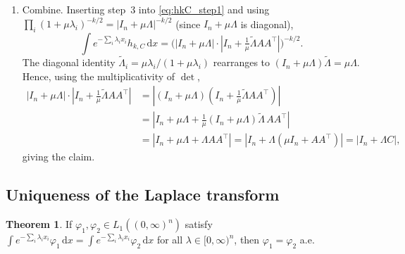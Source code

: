 \documentclass[12pt,a4paper]{article}
\makeatletter
\theoremstyle{definition}
\newtheorem{theorem}{Theorem}[section]
\renewenvironment{proof}[1][\proofname]{\par
  \pushQED{\qed}%
  \normalfont \topsep6\p@\@plus6\p@\relax
  \trivlist
  \item[\hskip\labelsep\bfseries #1\@addpunct{.}]\ignorespaces
}{%
  \popQED\endtrivlist\@endpefalse
}
\newcommand{\dd}{\mathrm{d}}
\makeatother
\begin{document}
\begin{proof}
\begin{enumerate}
    \item Combine.  Inserting step~3 into \eqref{eq:hkC_step1} and
      using $\prod_i(1+\mu\lambda_i)^{-k/2}=|I_n+\mu\Lambda|^{-k/2}$
      (since $I_n+\mu\Lambda$ is diagonal),
      \[
        \int e^{-\sum_i\lambda_ix_i}h_{k,C}\,\dd x
        =\bigl(|I_n+\mu\Lambda|\cdot
          |I_n+\tfrac{1}{\mu}\tilde\Lambda AA^\top|\bigr)^{-k/2}.
      \]
      The diagonal identity
      $\tilde\Lambda_i=\mu\lambda_i/(1+\mu\lambda_i)$ rearranges to
      $(I_n+\mu\Lambda)\tilde\Lambda=\mu\Lambda$.  Hence, using the
      multiplicativity of $\det$,
      \begin{align*}
        |I_n+\mu\Lambda|\cdot|I_n+\tfrac{1}{\mu}\tilde\Lambda AA^\top|
        &=|(I_n+\mu\Lambda)(I_n+\tfrac{1}{\mu}\tilde\Lambda AA^\top)|\\
        &=|I_n+\mu\Lambda
          +\tfrac{1}{\mu}(I_n+\mu\Lambda)\tilde\Lambda\,AA^\top|\\
        &=|I_n+\mu\Lambda+\Lambda AA^\top|
        =|I_n+\Lambda(\mu I_n+AA^\top)|=|I_n+\Lambda C|,
      \end{align*}
      giving the claim.
  \end{enumerate}
\end{proof}


\subsection{Uniqueness of the Laplace transform}

\begin{theorem}\label{thm:laplace_inj}
  If $\varphi_1,\varphi_2\in L_1((0,\infty)^n)$ satisfy
  $\int e^{-\sum_i\lambda_ix_i}\varphi_1\,\dd x
  =\int e^{-\sum_i\lambda_ix_i}\varphi_2\,\dd x$ for all
  $\lambda\in[0,\infty)^n$, then $\varphi_1=\varphi_2$ a.e.
\end{theorem}
\end{document}
